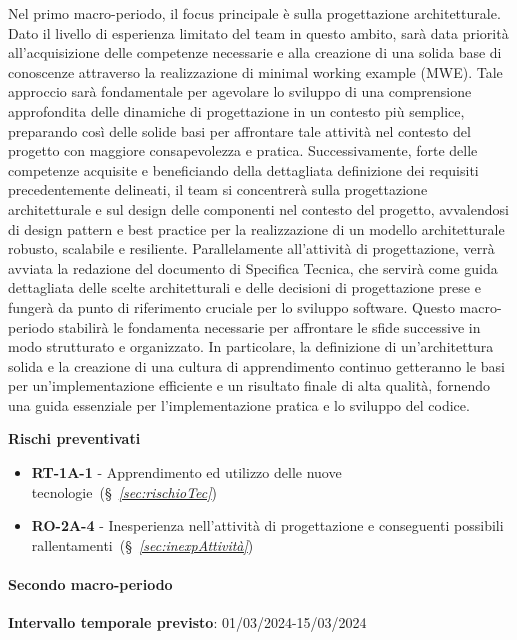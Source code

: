 Nel primo macro-periodo, il focus principale è sulla progettazione architetturale. Dato il livello di esperienza limitato del team in questo ambito, sarà data priorità all'acquisizione delle competenze necessarie e alla creazione di una solida base di conoscenze attraverso la realizzazione di minimal working example (MWE). Tale approccio sarà fondamentale per agevolare lo sviluppo di una comprensione approfondita delle dinamiche di progettazione in un contesto più semplice, preparando così delle solide basi per affrontare tale attività nel contesto del progetto con maggiore consapevolezza e pratica.
Successivamente, forte delle competenze acquisite e beneficiando della dettagliata definizione dei requisiti precedentemente delineati, il team si concentrerà sulla progettazione architetturale e sul design delle componenti nel contesto del progetto, avvalendosi di design pattern e best practice per la realizzazione di un modello architetturale robusto, scalabile e resiliente.
Parallelamente all’attività di progettazione, verrà avviata la redazione del documento di Specifica Tecnica, che servirà come guida dettagliata delle scelte architetturali e delle decisioni di progettazione prese e fungerà da punto di riferimento cruciale per lo sviluppo software.
Questo macro-periodo stabilirà le fondamenta necessarie per affrontare le sfide successive in modo strutturato e organizzato. In particolare, la definizione di un'architettura solida e la creazione di una cultura di apprendimento continuo getteranno le basi per un'implementazione efficiente e un risultato finale di alta qualità, fornendo una guida essenziale per l'implementazione pratica e lo sviluppo del codice.

\vspace{0.4cm}

\textbf{Rischi preventivati}
\begin{itemize}
    \item \textbf{RT-1A-1} - Apprendimento ed utilizzo delle nuove tecnologie~(\S~\textit{\ref{sec:rischioTec}})
    \item \textbf{RO-2A-4} - Inesperienza nell’attività di progettazione e conseguenti possibili rallentamenti~(\S~\textit{\ref{sec:inexpAttività}})
\end{itemize}

\paragraph{Secondo macro-periodo}

\textbf{Intervallo temporale previsto}: 01/03/2024-15/03/2024 \\

